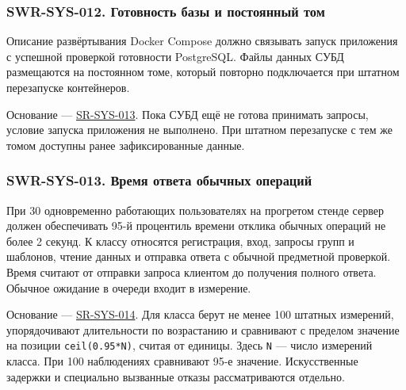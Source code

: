 \documentclass[12pt,a4paper]{article}
\begin{document}
\subsubsection{SWR-SYS-012. Готовность базы и постоянный том}\label{swr-sys-012-ux433ux43eux442ux43eux432ux43dux43eux441ux442ux44c-ux431ux430ux437ux44b-ux438-ux43fux43eux441ux442ux43eux44fux43dux43dux44bux439-ux442ux43eux43c}

\hypertarget{swr-sys-012-готовность-базы-и-постоянный-том}{}

\hypertarget{swr-sys-012}{}

Описание развёртывания Docker Compose должно связывать запуск приложения с успешной проверкой готовности PostgreSQL. Файлы данных СУБД размещаются на постоянном томе, который повторно подключается при штатном перезапуске контейнеров.

Основание --- {\href{../04\_Системные\_требования/DOC-05\_Системные\_требования.pdf\#sr-sys-013}{SR-SYS-013}}. Пока СУБД ещё не готова принимать запросы, условие запуска приложения не выполнено. При штатном перезапуске с тем же томом доступны ранее зафиксированные данные.

\subsubsection{SWR-SYS-013. Время ответа обычных операций}\label{swr-sys-013-ux432ux440ux435ux43cux44f-ux43eux442ux432ux435ux442ux430-ux43eux431ux44bux447ux43dux44bux445-ux43eux43fux435ux440ux430ux446ux438ux439}

\hypertarget{swr-sys-013-время-ответа-обычных-операций}{}

\hypertarget{swr-sys-013}{}

При 30 одновременно работающих пользователях на прогретом стенде сервер должен обеспечивать 95-й процентиль времени отклика обычных операций не более 2 секунд. К классу относятся регистрация, вход, запросы групп и шаблонов, чтение данных и отправка ответа с обычной предметной проверкой. Время считают от отправки запроса клиентом до получения полного ответа. Обычное ожидание в очереди входит в измерение.

Основание --- {\href{../04\_Системные\_требования/DOC-05\_Системные\_требования.pdf\#sr-sys-014}{SR-SYS-014}}. Для класса берут не менее 100 штатных измерений, упорядочивают длительности по возрастанию и сравнивают с пределом значение на позиции \texttt{ceil(0.\allowbreak{}95*N)}, считая от единицы. Здесь \texttt{N} --- число измерений класса. При 100 наблюдениях сравнивают 95-е значение. Искусственные задержки и специально вызванные отказы рассматриваются отдельно.
\end{document}
